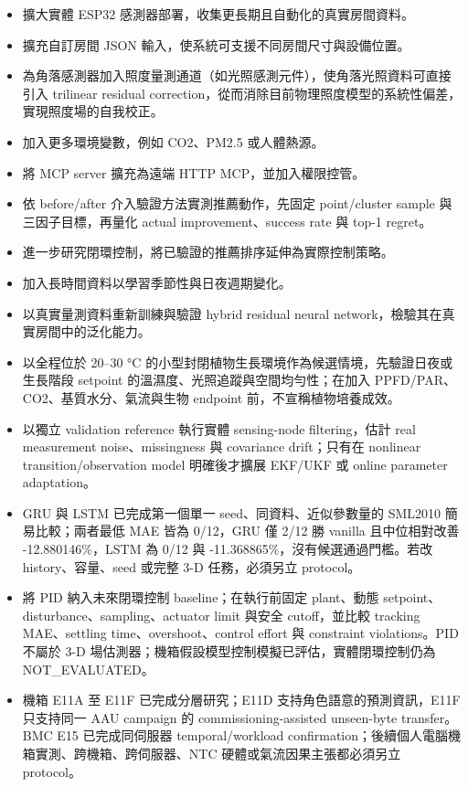 \documentclass[12pt,a4paper]{article}
\begin{document}
\begin{itemize}
\item 擴大實體 ESP32 感測器部署，收集更長期且自動化的真實房間資料。
\item 擴充自訂房間 JSON 輸入，使系統可支援不同房間尺寸與設備位置。
\item 為角落感測器加入照度量測通道（如光照感測元件），使角落光照資料可直接引入 trilinear residual correction，從而消除目前物理照度模型的系統性偏差，實現照度場的自我校正。
\item 加入更多環境變數，例如 CO2、PM2.5 或人體熱源。
\item 將 MCP server 擴充為遠端 HTTP MCP，並加入權限控管。
\item 依 before/after 介入驗證方法實測推薦動作，先固定 point/cluster sample 與三因子目標，再量化 actual improvement、success rate 與 top-1 regret。
\item 進一步研究閉環控制，將已驗證的推薦排序延伸為實際控制策略。
\item 加入長時間資料以學習季節性與日夜週期變化。
\item 以真實量測資料重新訓練與驗證 hybrid residual neural network，檢驗其在真實房間中的泛化能力。
\item 以全程位於 20–30 °C 的小型封閉植物生長環境作為候選情境，先驗證日夜或生長階段 setpoint 的溫濕度、光照追蹤與空間均勻性；在加入 PPFD/PAR、CO2、基質水分、氣流與生物 endpoint 前，不宣稱植物培養成效。
\item 以獨立 validation reference 執行實體 sensing-node filtering，估計 real measurement noise、missingness 與 covariance drift；只有在 nonlinear transition/observation model 明確後才擴展 EKF/UKF 或 online parameter adaptation。
\item GRU 與 LSTM 已完成第一個單一 seed、同資料、近似參數量的 SML2010 簡易比較；兩者最低 MAE 皆為 0/12，GRU 僅 2/12 勝 vanilla 且中位相對改善 -12.880146\%，LSTM 為 0/12 與 -11.368865\%，沒有候選通過門檻。若改 history、容量、seed 或完整 3-D 任務，必須另立 protocol。
\item 將 PID 納入未來閉環控制 baseline；在執行前固定 plant、動態 setpoint、disturbance、sampling、actuator limit 與安全 cutoff，並比較 tracking MAE、settling time、overshoot、control effort 與 constraint violations。PID 不屬於 3-D 場估測器；機箱假設模型控制模擬已評估，實體閉環控制仍為 NOT\_\allowbreak{}EVALUATED。
\item 機箱 E11A 至 E11F 已完成分層研究；E11D 支持角色語意的預測資訊，E11F 只支持同一 AAU campaign 的 commissioning-assisted unseen-byte transfer。BMC E15 已完成同伺服器 temporal/workload confirmation；後續個人電腦機箱實測、跨機箱、跨伺服器、NTC 硬體或氣流因果主張都必須另立 protocol。
\end{itemize}
\end{document}
